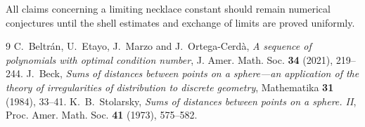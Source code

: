 \documentclass[11pt]{article}
\begin{document}
All claims concerning a limiting necklace constant should remain numerical
conjectures until the shell estimates and exchange of limits are proved
uniformly.

\begin{thebibliography}{9}
C.~Beltr\'an, U.~Etayo, J.~Marzo and J.~Ortega-Cerd\`a,
\emph{A sequence of polynomials with optimal condition number},
J. Amer. Math. Soc. \textbf{34} (2021), 219--244.
J.~Beck, \emph{Sums of distances between points on a sphere---an application
of the theory of irregularities of distribution to discrete geometry},
Mathematika \textbf{31} (1984), 33--41.
K.~B.~Stolarsky, \emph{Sums of distances between points on a sphere. II},
Proc. Amer. Math. Soc. \textbf{41} (1973), 575--582.
\end{thebibliography}
\end{document}
